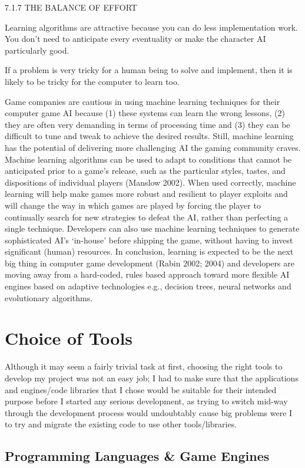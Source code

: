 \documentclass[a4paper,oneside]{report}
\begin{document}
7.1.7 THE BALANCE OF EFFORT

Learning algorithms are attractive because you can do less implementation work. You don’t need to anticipate every eventuality or make the character AI particularly good.

If a problem is very tricky for a human being to solve and implement, then it is likely to be tricky for the computer to learn too.
	
Game companies are cautious in using machine learning techniques for their computer game AI because (1) these systems can learn the wrong lessons, (2) they are often very demanding in terms of processing time and (3) they can be difficult to tune and tweak to achieve the desired results. Still, machine learning has the potential of delivering more challenging AI the gaming community craves. Machine learning algorithms can be used to adapt to conditions that cannot be anticipated prior to a game’s release, such as the particular styles, tastes, and dispositions of individual players (Manslow 2002). When used correctly, machine learning will help make games more robust and resilient to player exploits and will change the way in which games are played by forcing the player to continually search for new strategies to defeat the AI, rather than perfecting a single technique. Developers can also use machine learning techniques to generate sophisticated AI’s ‘in-house’ before shipping the game, without having to invest significant (human) resources.
In conclusion, learning is expected to be the next big thing in computer game development (Rabin 2002; 2004) and developers are moving away from a hard-coded, rules based approach toward more flexible AI engines based on adaptive technologies e.g., decision trees, neural networks and evolutionary algorithms.
	
\chapter{Choice of Tools}

Although it may seem a fairly trivial task at first, choosing the right tools to develop my project was not an easy job; I had to make sure that the applications and engines/code libraries that I chose would be suitable for their intended purpose before I started any serious development, as trying to switch mid-way through the development process would undoubtably cause big problems were I to try and migrate the existing code to use other tools/libraries.

\section{Programming Languages \& Game Engines}
\end{document}
